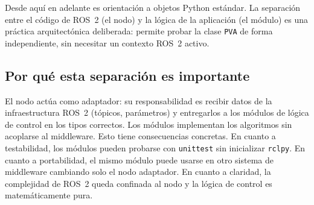 Desde aquí en adelante es orientación a objetos Python estándar. La separación entre el código de ROS~2 (el nodo) y la lógica de la aplicación (el módulo) es una práctica arquitectónica deliberada: permite probar la clase \texttt{PVA} de forma independiente, sin necesitar un contexto ROS~2 activo.

\subsection{Por qué esta separación es importante}

El nodo actúa como adaptador: su responsabilidad es recibir datos de la infraestructura ROS~2 (tópicos, parámetros) y entregarlos a los módulos de lógica de control en los tipos correctos. Los módulos implementan los algoritmos sin acoplarse al middleware. Esto tiene consecuencias concretas. En cuanto a testabilidad, los módulos pueden probarse con \texttt{unittest} sin inicializar \texttt{rclpy}. En cuanto a portabilidad, el mismo módulo puede usarse en otro sistema de middleware cambiando solo el nodo adaptador. En cuanto a claridad, la complejidad de ROS~2 queda confinada al nodo y la lógica de control es matemáticamente pura.
